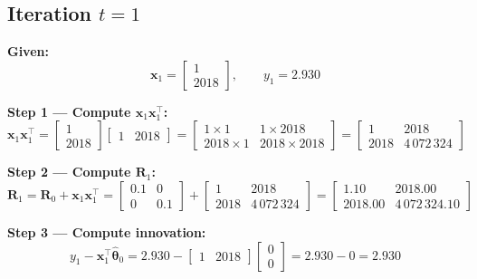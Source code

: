 \documentclass[11pt,a4paper]{article}
\begin{document}
\subsection*{Iteration $t=1$}

\textbf{Given:}
\[
\boldsymbol{x}_1 = \begin{bmatrix} 1 \\ 2018 \end{bmatrix}, \qquad y_1 = 2.930
\]

\textbf{Step 1 --- Compute $\boldsymbol{x}_1 \boldsymbol{x}_1^\top$:}
\[
\boldsymbol{x}_1 \boldsymbol{x}_1^\top
= \begin{bmatrix} 1 \\ 2018 \end{bmatrix} \begin{bmatrix} 1 & 2018 \end{bmatrix}
= \begin{bmatrix} 1 \times 1 & 1 \times 2018 \\ 2018 \times 1 & 2018 \times 2018 \end{bmatrix}
= \begin{bmatrix} 1 & 2018 \\ 2018 & 4\,072\,324 \end{bmatrix}
\]

\textbf{Step 2 --- Compute $\boldsymbol{R}_1$:}
\[
\boldsymbol{R}_1 = \boldsymbol{R}_0 + \boldsymbol{x}_1 \boldsymbol{x}_1^\top
= \begin{bmatrix} 0.1 & 0 \\ 0 & 0.1 \end{bmatrix} + \begin{bmatrix} 1 & 2018 \\ 2018 & 4\,072\,324 \end{bmatrix}
= \begin{bmatrix} 1.10 & 2018.00 \\ 2018.00 & 4\,072\,324.10 \end{bmatrix}
\]

\textbf{Step 3 --- Compute innovation:}
\[
y_1 - \boldsymbol{x}_1^\top \hat{\boldsymbol{\theta}}_0
= 2.930 - \begin{bmatrix} 1 & 2018 \end{bmatrix} \begin{bmatrix} 0 \\ 0 \end{bmatrix}
= 2.930 - 0
= 2.930
\]
\end{document}
